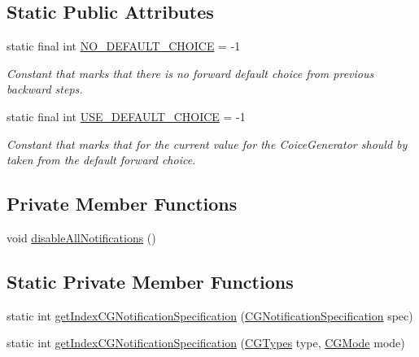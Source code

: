 \subsection*{Static Public Attributes}
\begin{DoxyCompactItemize}
\item 
static final int \hyperlink{interfacegov_1_1nasa_1_1jpf_1_1inspector_1_1interfaces_1_1_choice_generators_interface_a96ec402a57d2b3547337e677e23075cd}{N\+O\+\_\+\+D\+E\+F\+A\+U\+L\+T\+\_\+\+C\+H\+O\+I\+CE} = -\/1
\begin{DoxyCompactList}\small\item\em Constant that marks that there is no forward default choice from previous backward steps. \end{DoxyCompactList}\item 
static final int \hyperlink{interfacegov_1_1nasa_1_1jpf_1_1inspector_1_1interfaces_1_1_choice_generators_interface_ac57a2bb0eb101be2c2b27bd19cb81ea7}{U\+S\+E\+\_\+\+D\+E\+F\+A\+U\+L\+T\+\_\+\+C\+H\+O\+I\+CE} = -\/1
\begin{DoxyCompactList}\small\item\em Constant that marks that for the current value for the Coice\+Generator should by taken from the default forward choice. \end{DoxyCompactList}\end{DoxyCompactItemize}
\subsection*{Private Member Functions}
\begin{DoxyCompactItemize}
\item 
void \hyperlink{classgov_1_1nasa_1_1jpf_1_1inspector_1_1server_1_1choicegenerators_1_1_choice_generators_manager_a916c169286ffdaa525d62c55c7e5caf7}{disable\+All\+Notifications} ()
\end{DoxyCompactItemize}
\subsection*{Static Private Member Functions}
\begin{DoxyCompactItemize}
\item 
static int \hyperlink{classgov_1_1nasa_1_1jpf_1_1inspector_1_1server_1_1choicegenerators_1_1_choice_generators_manager_a38613d9107860e047acb350d21a0a69d}{get\+Index\+C\+G\+Notification\+Specification} (\hyperlink{classgov_1_1nasa_1_1jpf_1_1inspector_1_1interfaces_1_1_choice_generators_interface_1_1_c_g_notification_specification}{C\+G\+Notification\+Specification} spec)
\item 
static int \hyperlink{classgov_1_1nasa_1_1jpf_1_1inspector_1_1server_1_1choicegenerators_1_1_choice_generators_manager_a3b1dd9928c0227cc7a7cb5b33c726e31}{get\+Index\+C\+G\+Notification\+Specification} (\hyperlink{enumgov_1_1nasa_1_1jpf_1_1inspector_1_1interfaces_1_1_choice_generators_interface_1_1_c_g_types}{C\+G\+Types} type, \hyperlink{enumgov_1_1nasa_1_1jpf_1_1inspector_1_1interfaces_1_1_choice_generators_interface_1_1_c_g_mode}{C\+G\+Mode} mode)
\end{DoxyCompactItemize}
